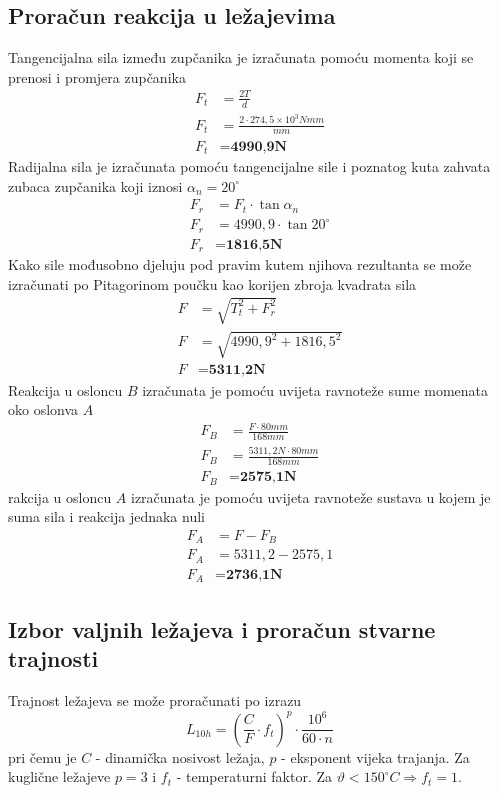 \documentclass[12pt,a4paper]{article}
\begin{document}
\subsection{Proračun reakcija u ležajevima}
Tangencijalna sila između zupčanika je izračunata pomoću momenta koji se prenosi i promjera zupčanika
\begin{align*}
F_t&=\frac{2T}{d}\\
F_t&=\frac{2 \cdot 274,5 \times 10^3 Nmm}{mm}\\
F_t&=\textbf{4990,9N}
\end{align*}
Radijalna sila je izračunata pomoću tangencijalne sile i poznatog kuta zahvata zubaca zupčanika koji iznosi $\alpha_n=20^\circ$
\begin{align*}
F_r&=F_t \cdot \tan \alpha_n\\
F_r&=4990,9 \cdot \tan 20^\circ\\
F_r&=\textbf{1816,5N}
\end{align*}
Kako sile mođusobno djeluju pod pravim kutem njihova rezultanta se može izračunati po Pitagorinom poučku kao korijen zbroja kvadrata sila
\begin{align*}
F&=\sqrt{T_t^2 + F_r^2}\\
F&=\sqrt{4990,9^2 + 1816,5^2}\\
F&=\textbf{5311,2N}
\end{align*}
Reakcija u osloncu $B$ izračunata je pomoću uvijeta ravnoteže sume momenata oko oslonva $A$
\begin{align*}
F_B&=\frac{F \cdot 80mm}{168mm}\\
F_B&=\frac{5311,2N \cdot 80mm}{168mm}\\
F_B&=\textbf{2575,1N}
\end{align*}
rakcija u osloncu $A$ izračunata je pomoću uvijeta ravnoteže sustava u kojem je suma sila i reakcija jednaka nuli
\begin{align*}
F_A&=F-F_B\\
F_A&=5311,2-2575,1\\
F_A&=\textbf{2736,1N}
\end{align*}

\subsection{Izbor valjnih ležajeva i proračun stvarne trajnosti}
Trajnost ležajeva se može proračunati po izrazu
\begin{equation}
L_{10h}=\left(\frac{C}{F} \cdot f_t \right)^p \cdot \frac{10^6}{60 \cdot n}
\label{equ:trajnostLezaja}
\end{equation}
pri čemu je $C$ - dinamička nosivost ležaja, $p$ - eksponent vijeka trajanja. Za kuglične ležajeve $p=3$ i $f_t$ - temperaturni faktor. Za $\vartheta < 150^\circ C \Rightarrow f_t=1$.
\end{document}
